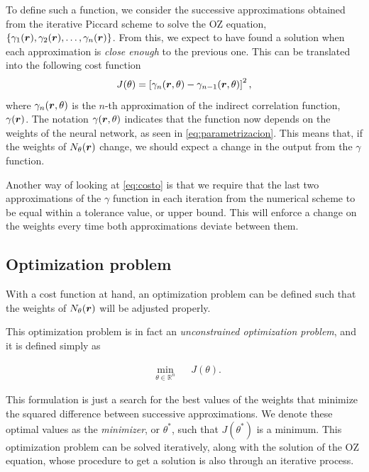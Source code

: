 To define such a function, we consider the successive approximations obtained from the
iterative Piccard scheme to solve the OZ equation, $\left\{\gamma_1(\bm{r}), \gamma_2(\bm{r}), \dots, \gamma_n(\bm{r})\right\}$.
From this, we expect to have found a solution when each approximation
is \emph{close enough} to the previous one. This can be translated into the following
cost function
\begin{equation}
    J(\theta) = \left[\gamma_{n}(\bm{r}, \theta) - \gamma_{n-1}(\bm{r}, \theta) \right]^2 ,
    \label{eq:costo}
\end{equation}
where $\gamma_{n}(\bm{r}, \theta)$ is the $n$-th approximation of the indirect
correlation function, $\gamma(\bm{r})$.
The notation $\gamma(\bm{r}, \theta)$ indicates that the function now depends
on the weights of the neural network, as seen in \autoref{eq:parametrizacion}.
This means that, if the weights of $N_{\theta}(\bm{r})$ change, we should expect a change in the output
from the $\gamma$ function.

Another way of looking at \autoref{eq:costo} is that we require that the last 
two approximations of the $\gamma$ function in each iteration from the numerical scheme to 
be equal within a tolerance value, or upper bound. This will enforce a change on the 
weights every time both approximations deviate between them.

\subsection{Optimization problem}
With a cost function at hand, an optimization problem can be defined such that the
weights of $N_{\theta}(\bm{r})$ will be adjusted properly.

This optimization problem is in fact an \emph{unconstrained optimization problem},
and it is defined simply as

\begin{equation}
    \begin{aligned}
         & \underset{\theta \in \mathbb{R}^n}{\text{min}}
         & & J(\theta) .
    \end{aligned}
    \label{eq:optimizacion}
\end{equation}

This formulation is just a search for the best values of the weights that minimize
the squared difference between successive approximations. We denote these optimal values
as the \emph{minimizer}, or $\theta^{*}$, such that $J(\theta^{*})$ is a minimum.
This optimization problem can be solved iteratively, along with the solution of the
OZ equation, whose procedure to get a solution is also through an iterative process.

